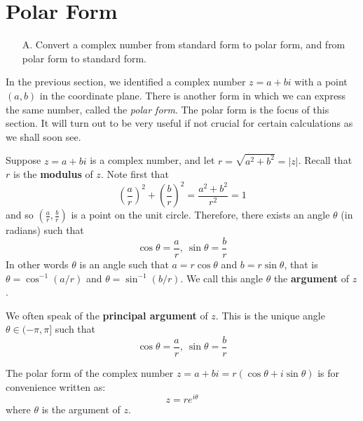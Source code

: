 \section{Polar Form}

\begin{outcome}
\begin{enumerate}
\item[A.] Convert a complex number from standard form to polar form, and from polar form to standard form. 
\end{enumerate}
\end{outcome}

In the previous section, we identified a complex number $z=a+bi$ with
a point $\left( a, b\right)$ in the coordinate plane. There is 
another form in which we can express the same number, called the {\em
polar form\em}. The polar form is the focus of this section. It will turn out to be
very useful if not crucial for certain calculations as we shall soon
see.

Suppose $z=a+bi$ is a complex number,  and let 
$r=\sqrt{a^{2}+b^{2}} = |z|$. Recall that $r$ is the \textbf{modulus} of $z$. Note first that
\begin{equation*}
\left( \frac{a}{r} \right) ^{2}+\left( \frac{b}{r}\right) ^{2}=   \frac{a^2+b^2}{r^2}=1
\end{equation*}
and so $\left( \frac{a}{r},\frac{b}{r}\right)$
is a point on the unit circle. Therefore, there exists an angle  $
\theta$ (in radians) such that
\begin{equation*}
\cos \theta =\frac{a}{r},\ \sin \theta =\frac{b}{r}
\end{equation*}
In other words $\theta$ is an angle such
that $ a = r\cos \theta$ and $b=r \sin \theta$, that is $\theta = \cos^{-1}(a/r)$ and $\theta = \sin^{-1}(b/r)$. We call
this angle $\theta$ the \textbf{argument} of $z$. 

We often speak of the \textbf{principal argument} of $z$. This is the unique angle $\theta \in (-\pi, \pi]$ such that 
\begin{equation*}
\cos \theta =\frac{a}{r},\ \sin \theta =\frac{b}{r}
\end{equation*}

The polar form of the complex number $z=a+bi = r \left( \cos \theta +i\sin \theta \right)$ is for convenience written as:
\begin{equation*}
z = r e^{i \theta}
\end{equation*}
where $\theta $ is the argument of
$z$. 

